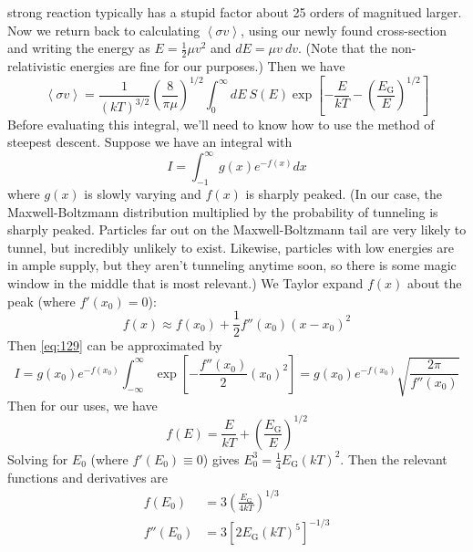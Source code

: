 \documentclass[10pt]{article}
\numberwithin{equation}{section}
\newcommand{\avg}[1]{\left\langle#1\right\rangle}
\begin{document}
  strong reaction typically has a stupid factor about 25 orders of
  magnitued larger. Now we return back
  to calculating $\avg{\sigma v}$, using our newly found cross-section
  and writing the energy as $E=\frac{1}{2}\mu v^2$ and $dE=\mu v\
  dv$. (Note that the non-relativistic energies are fine for our
  purposes.) Then we have
  \begin{equation}
    \label{eq:128}
    \avg{\sigma
      v}=\frac{1}{(kT)^{3/2}}\left(\frac{8}{\pi\mu}\right)^{1/2}\int_0^
\infty
    dE\ S(E)\exp\left[-\frac{E}{kT}-\left(\frac{E_\mathrm{G}}{E}\right)^
{1/2}\right]
  \end{equation}
  Before evaluating this integral, we'll need to know how to use the
  method of steepest descent. Suppose we have an integral with
  \begin{equation}
    \label{eq:129}
    I=\int_{-1}^{\infty}g(x)e^{-f(x)}dx
  \end{equation}
  where $g(x)$ is slowly varying and $f(x)$ is sharply peaked. (In our
  case, the Maxwell-Boltzmann distribution multiplied by the
  probability of tunneling is sharply peaked. Particles far out on the
  Maxwell-Boltzmann tail are very likely to tunnel, but incredibly
  unlikely to exist. Likewise, particles with low energies are in
  ample supply, but they aren't tunneling anytime soon, so there is
  some magic window in the middle that is most relevant.) We Taylor
  expand $f(x)$ about the peak (where $f'(x_0)=0$):
  \begin{equation}
    \label{eq:130}
    f(x)\approx f(x_0)+\frac{1}{2}f''(x_0)(x-x_0)^2
  \end{equation}
  Then \eqref{eq:129} can be approximated by
  \begin{equation}
    \label{eq:131}
    I=g(x_0)e^{-f(x_0)}\int_{-\infty}^{\infty}\exp\left[-\frac{f''(x_0)}{2}
(x_0)^2\right]=g(x_0)e^{-f(x_0)}\sqrt{\frac{2\pi}{f''(x_0)}}
  \end{equation}
  Then for our uses, we have
  \begin{equation}
    \label{eq:132}
    f(E)=\frac{E}{kT}+\left(\frac{E_{\mathrm{G}}}{E}\right)^{1/2}
  \end{equation}
  Solving for $E_0$ (where $f'(E_0)\equiv 0$) gives
  $E_0^3=\frac{1}{4}E_{\mathrm{G}}(kT)^2$. Then the relevant functions
  and derivatives are
  \begin{align}
    \label{eq:133}
    f(E_0)&=3\left(\frac{E_{\mathrm{G}}}{4kT}\right)^{1/3}\\
    \label{eq:133a}
    f''(E_0)&=3\left[2E_{\mathrm{G}}(kT)^5\right]^{-1/3}
  \end{align}
\end{document}
